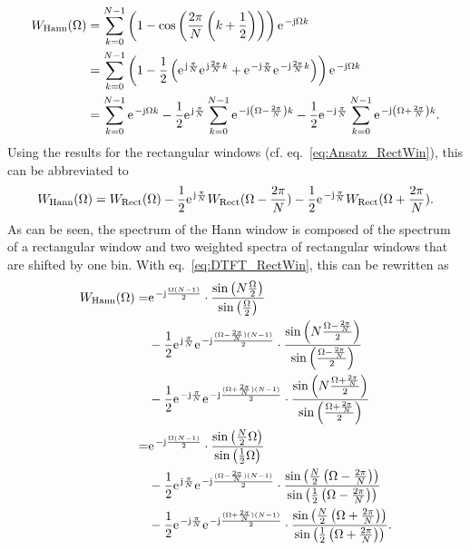 \documentclass[11pt,a4paper,DIV=12]{scrartcl}
\begin{document}
%
\begin{align}
W_{\text{Hann}}(\Omega)&=\sum\limits_{k=0}^{N-1}\left(1-\cos\left(\frac{2\pi}{N}\left(k+\frac{1}{2}\right)\right)\right)\e^{-\im\Omega k}\\
&=\sum\limits_{k=0}^{N-1}\left(1-\frac{1}{2}\left(\e^{\im\frac{\pi}{N}}\e^{\im\frac{2\pi}{N}k}+\e^{-\im\frac{\pi}{N}}\e^{-\im\frac{2\pi}{N}k}\right)\right)\e^{-\im\Omega k}\\
&=\sum\limits_{k=0}^{N-1}\e^{-\im\Omega k}-\frac{1}{2}\e^{\im\frac{\pi}{N}}\sum\limits_{k=0}^{N-1}\e^{-\im\left(\Omega-\frac{2\pi}{N}\right)k}-\frac{1}{2}\e^{-\im\frac{\pi}{N}}\sum\limits_{k=0}^{N-1}\e^{-\im\left(\Omega+\frac{2\pi}{N}\right)k}.
\end{align}
%
Using the results for the rectangular windows
(cf. eq.~\eqref{eq:Ansatz_RectWin}), this can be abbreviated to
%
\begin{equation}
W_{\text{Hann}}(\Omega)=W_{\text{Rect}}(\Omega)-\frac{1}{2}\e^{\im\frac{\pi}{N}}W_{\text{Rect}}(\Omega-\frac{2\pi}{N})-\frac{1}{2}\e^{-\im\frac{\pi}{N}}W_{\text{Rect}}(\Omega+\frac{2\pi}{N}).
\end{equation}
%
As can be seen, the spectrum of the Hann window is composed of the spectrum
of a rectangular window and two weighted spectra of rectangular windows
that are shifted by one bin.
%
With eq.~\eqref{eq:DTFT_RectWin}, this can be rewritten as
%
\begin{align}
W_{\text{Hann}}(\Omega)=&\e^{-\im\frac{\Omega(N-1)}{2}}\cdot\frac{\sin\left(N\frac{\Omega}{2}\right)}{\sin\left(\frac{\Omega}{2}\right)}\nonumber\\
&-\frac{1}{2}\e^{\im\frac{\pi}{N}}\e^{-\im\frac{(\Omega-\frac{2\pi}{N})(N-1)}{2}}\cdot\frac{\sin\left(N\frac{\Omega-\frac{2\pi}{N}}{2}\right)}{\sin\left(\frac{\Omega-\frac{2\pi}{N}}{2}\right)}\nonumber\\
&-\frac{1}{2}\e^{-\im\frac{\pi}{N}}\e^{-\im\frac{(\Omega+\frac{2\pi}{N})(N-1)}{2}}\cdot\frac{\sin\left(N\frac{\Omega+\frac{2\pi}{N}}{2}\right)}{\sin\left(\frac{\Omega+\frac{2\pi}{N}}{2}\right)}\\
=&\e^{-\im\frac{\Omega(N-1)}{2}}\cdot\frac{\sin\left(\frac{N}{2}\Omega\right)}{\sin\left(\frac{1}{2}\Omega\right)}\nonumber\\
&-\frac{1}{2}\e^{\im\frac{\pi}{N}}\e^{-\im\frac{(\Omega-\frac{2\pi}{N})(N-1)}{2}}\cdot\frac{\sin\left(\frac{N}{2}\left(\Omega-\frac{2\pi}{N}\right)\right)}{\sin\left(\frac{1}{2}\left(\Omega-\frac{2\pi}{N}\right)\right)}\nonumber\\
&-\frac{1}{2}\e^{-\im\frac{\pi}{N}}\e^{-\im\frac{(\Omega+\frac{2\pi}{N})(N-1)}{2}}\cdot\frac{\sin\left(\frac{N}{2}\left(\Omega+\frac{2\pi}{N}\right)\right)}{\sin\left(\frac{1}{2}\left(\Omega+\frac{2\pi}{N}\right)\right)}.
\end{align}
\end{document}

